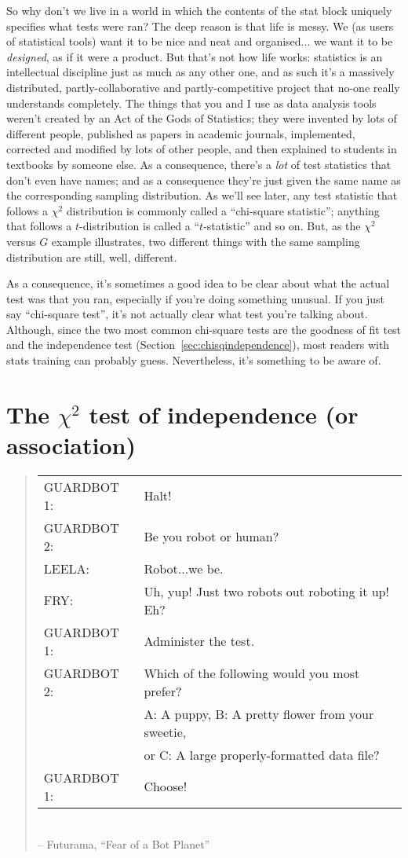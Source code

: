 So why don't we live in a world in which the contents of the stat block uniquely specifies what tests were ran? The deep reason is that life is messy. We (as users of statistical tools) want it to be nice and neat and organised... we want it to be {\it designed}, as if it were a product. But that's not how life works: statistics is an intellectual discipline just as much as any other one, and as such it's a massively distributed, partly-collaborative and partly-competitive project that no-one really understands completely. The things that you and I use as data analysis tools weren't created by an Act of the Gods of Statistics; they were invented by lots of different people, published as papers in academic journals, implemented, corrected and modified by lots of other people, and then explained to students in textbooks by someone else. As a consequence, there's a {\it lot} of test statistics that don't even have names; and as a consequence they're just given the same name as the corresponding sampling distribution. As we'll see later, any test statistic that follows a $\chi^2$ distribution is commonly called a ``chi-square statistic''; anything that follows a $t$-distribution is called a ``$t$-statistic'' and so on. But, as the $\chi^2$ versus $G$ example illustrates, two different things with the same sampling distribution are still, well, different. 

As a consequence, it's sometimes a good idea to be clear about what the actual test was that you ran, especially if you're doing something unusual. If you just say ``chi-square test'', it's not actually clear what test you're talking about. Although, since the two most common chi-square tests are the goodness of fit test and the independence test (Section~\ref{sec:chisqindependence}), most readers with stats training can probably guess. Nevertheless, it's something to be aware of.


\section{The $\chi^2$ test of independence (or association)\label{sec:chisqindependence}}

\begin{quote}
{\it
\begin{tabular}{ll}
GUARDBOT 1:& Halt! \\
GUARDBOT 2:& Be you robot or human? \\
LEELA:& Robot...we be. \\
FRY:& Uh, yup! Just two robots out roboting it up!  Eh? \\
GUARDBOT 1:& Administer the test. \\
GUARDBOT 2:& Which of the following would you most prefer? \\
& A: A puppy, B: A pretty flower from your sweetie, \\
& or C: A large properly-formatted data file? \\
GUARDBOT 1:& Choose! \\
\end{tabular}
} \\
\hspace*{2cm} -- Futurama, ``Fear of a Bot Planet''
\end{quote}

